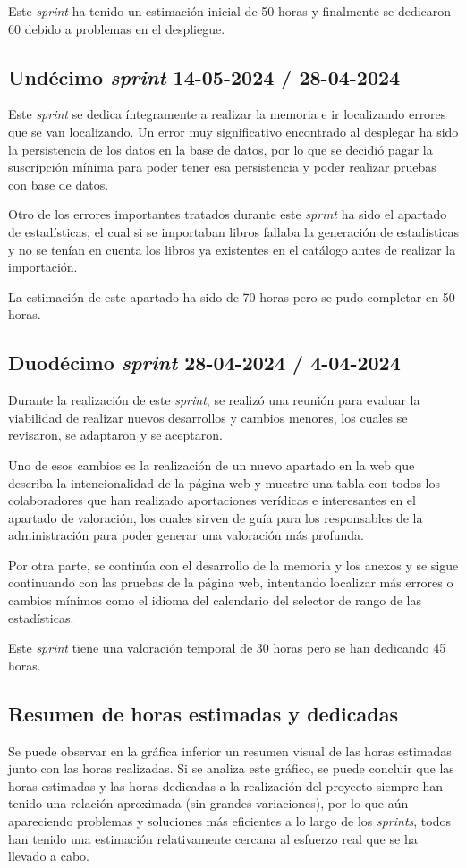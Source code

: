 Este \textit{sprint} ha tenido un estimación inicial de 50 horas y finalmente se dedicaron 60 debido a problemas en el despliegue.

\subsection{Undécimo \textit{sprint} 14-05-2024 / 28-04-2024}
Este \textit{sprint} se dedica íntegramente a realizar la memoria e ir localizando errores que se van localizando. 
Un error muy significativo encontrado al desplegar ha sido la persistencia de los datos en la base de datos, por lo que se decidió pagar la suscripción mínima para poder tener esa persistencia y poder realizar pruebas con base de datos.

Otro de los errores importantes tratados durante este \textit{sprint} ha sido el apartado de estadísticas, el cual si se importaban libros fallaba la generación de estadísticas y no se tenían en cuenta los libros ya existentes en el catálogo antes de realizar la importación.

La estimación de este apartado ha sido de 70 horas pero se pudo completar en 50 horas.

\subsection{Duodécimo \textit{sprint} 28-04-2024 / 4-04-2024}
Durante la realización de este \textit{sprint}, se realizó una reunión para evaluar la viabilidad de realizar nuevos desarrollos y cambios menores, los cuales se revisaron, se adaptaron y se aceptaron. 

Uno de esos cambios es la realización de un nuevo apartado en la web que describa la intencionalidad de la página web y muestre una tabla con todos los colaboradores que han realizado aportaciones verídicas e interesantes en el apartado de valoración, los cuales sirven de guía para los responsables de la administración para poder generar una valoración más profunda.

Por otra parte, se continúa con el desarrollo de la memoria y los anexos y se sigue continuando con las pruebas de la página web, intentando localizar más errores o cambios mínimos como el idioma del calendario del selector de rango de las estadísticas.

Este \textit{sprint} tiene una valoración temporal de 30 horas pero se han dedicando 45 horas.


\subsection{Resumen de horas estimadas y dedicadas}
Se puede observar en la gráfica inferior un resumen visual de las horas estimadas junto con las horas realizadas. Si se analiza este gráfico, se puede concluir que las horas estimadas y las horas dedicadas a la realización del proyecto siempre han tenido una relación aproximada (sin grandes variaciones), por lo que aún apareciendo problemas y soluciones más eficientes a lo largo de los \textit{sprints}, todos han tenido una estimación relativamente cercana al esfuerzo real que se ha llevado a cabo.

